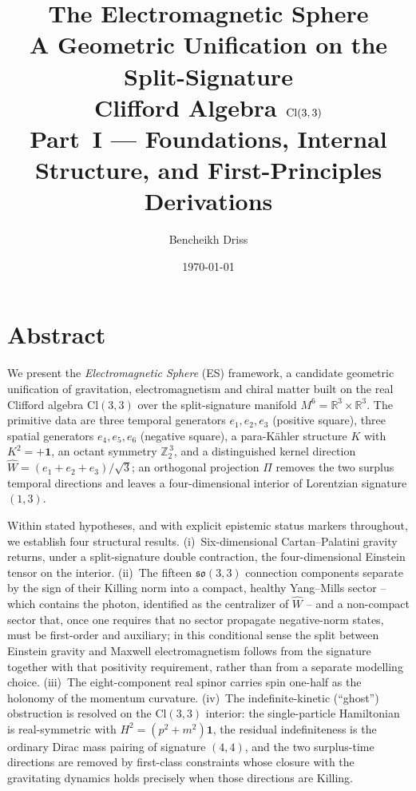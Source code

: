 \documentclass[11pt,oneside]{book}
\title{\bfseries The Electromagnetic Sphere\\[4pt]
\large A Geometric Unification on the Split-Signature\\ Clifford Algebra $\Cl(3,3)$\\[10pt]
\normalsize\mdseries Part~I --- Foundations, Internal Structure, and First-Principles Derivations}
\author{Bencheikh Driss}
\date{\today}
\newcommand{\Wh}{\hat{W}}                         %
\newcommand{\Cl}{\mathrm{Cl}}                     %
\newcommand{\Zt}{\mathbb{Z}_2}
\newcommand{\RR}{\mathbb{R}}
\newcommand{\so}{\mathfrak{so}}
\theoremstyle{plain}
\theoremstyle{definition}
\theoremstyle{remark}
\begin{document}
\frontmatter
\maketitle

\chapter*{Abstract}

We present the \emph{Electromagnetic Sphere} (ES) framework, a candidate geometric
unification of gravitation, electromagnetism and chiral matter built on the real
Clifford algebra $\Cl(3,3)$ over the split-signature manifold
$M^6=\RR^3\times\RR^3$. The primitive data are three temporal generators
$e_1,e_2,e_3$ (positive square), three spatial generators $e_4,e_5,e_6$ (negative
square), a para-K\"ahler structure $K$ with $K^2=+\mathbf 1$, an octant symmetry
$\Zt^{\,3}$, and a distinguished kernel direction $\Wh=(e_1+e_2+e_3)/\sqrt3$; an
orthogonal projection $\Pi$ removes the two surplus temporal directions and leaves
a four-dimensional interior of Lorentzian signature $(1,3)$.

Within stated hypotheses, and with explicit epistemic status markers throughout,
we establish four structural results. (i)~Six-dimensional Cartan--Palatini gravity
returns, under a split-signature double contraction, the four-dimensional Einstein
tensor on the interior. (ii)~The fifteen $\so(3,3)$ connection components separate
by the sign of their Killing norm into a compact, healthy Yang--Mills sector --
which contains the photon, identified as the centralizer of $\Wh$ -- and a
non-compact sector that, once one requires that no sector propagate negative-norm
states, must be first-order and auxiliary; in this conditional sense the split
between Einstein gravity and Maxwell electromagnetism follows from the signature
together with that positivity requirement, rather than from a separate modelling
choice. (iii)~The eight-component real spinor carries spin one-half as the holonomy
of the momentum curvature. (iv)~The indefinite-kinetic (``ghost'') obstruction is
resolved on the $\Cl(3,3)$ interior: the single-particle Hamiltonian is
real-symmetric with $H^2=(p^2+m^2)\mathbf 1$, the residual indefiniteness is the
ordinary Dirac mass pairing of signature $(4,4)$, and the two surplus-time
directions are removed by first-class constraints whose closure with the
gravitating dynamics holds precisely when those directions are Killing.
\end{document}
